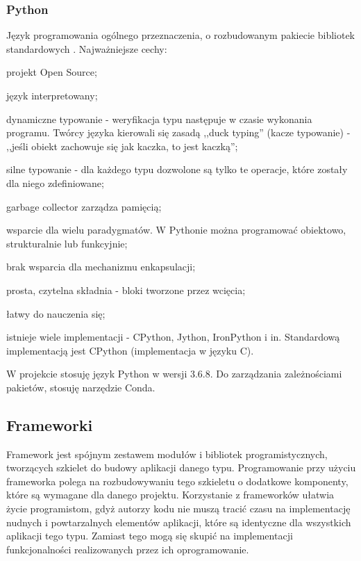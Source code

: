 \subsubsection{Python}
Język programowania ogólnego przeznaczenia, o rozbudowanym pakiecie bibliotek standardowych 
\cite{python:wikipedia}.
Najważniejsze cechy:
\begin{itemize*}
\item projekt Open Source;
\item język interpretowany;
\item dynamiczne typowanie - weryfikacja typu następuje w czasie wykonania programu. Twórcy języka kierowali się zasadą ,,duck typing'' (kacze typowanie) - ,,jeśli obiekt zachowuje się jak kaczka, to jest kaczką'';
\item silne typowanie - dla każdego typu dozwolone są tylko te operacje, które zostały dla niego zdefiniowane;
\item garbage collector zarządza pamięcią;
\item wsparcie dla wielu paradygmatów. W Pythonie można programować obiektowo, strukturalnie lub funkcyjnie;
\item brak wsparcia dla mechanizmu enkapsulacji;
\item prosta, czytelna składnia - bloki tworzone przez wcięcia;
\item łatwy do nauczenia się;
\item istnieje wiele implementacji - CPython, Jython, IronPython i in. Standardową implementacją jest CPython (implementacja w języku C).
\end{itemize*}
W projekcie stosuję język Python w wersji 3.6.8. Do zarządzania zależnościami pakietów, stosuję narzędzie Conda.

\subsection{Frameworki}
Framework jest spójnym zestawem modułów i bibliotek programistycznych, tworzących szkielet do budowy aplikacji danego typu. Programowanie przy użyciu frameworka polega na rozbudowywaniu tego szkieletu o dodatkowe komponenty, które są wymagane dla danego projektu. Korzystanie z frameworków ułatwia życie programistom, gdyż autorzy kodu nie muszą tracić czasu na implementację nudnych i powtarzalnych elementów aplikacji, które są identyczne dla wszystkich aplikacji tego typu. Zamiast tego mogą się skupić na implementacji funkcjonalności realizowanych przez ich oprogramowanie.
